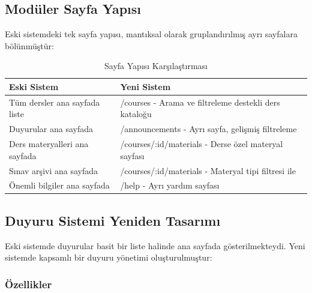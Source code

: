 \documentclass[12pt,a4paper]{article}
\begin{document}
\subsection{Modüler Sayfa Yapısı}

Eski sistemdeki tek sayfa yapısı, mantıksal olarak gruplandırılmış ayrı sayfalara bölünmüştür:

\begin{table}[H]
\centering
\caption{Sayfa Yapısı Karşılaştırması}
\begin{tabular}{@{}p{5cm}p{6cm}@{}}
\toprule
\textbf{Eski Sistem} & \textbf{Yeni Sistem} \\
\midrule
Tüm dersler ana sayfada liste & /courses - Arama ve filtreleme destekli ders kataloğu \\
\addlinespace
Duyurular ana sayfada & /announcements - Ayrı sayfa, gelişmiş filtreleme \\
\addlinespace
Ders materyalleri ana sayfada & /courses/:id/materials - Derse özel materyal sayfası \\
\addlinespace
Sınav arşivi ana sayfada & /courses/:id/materials - Materyal tipi filtresi ile \\
\addlinespace
Önemli bilgiler ana sayfada & /help - Ayrı yardım sayfası \\
\bottomrule
\end{tabular}
\end{table}

\subsection{Duyuru Sistemi Yeniden Tasarımı}

Eski sistemde duyurular basit bir liste halinde ana sayfada gösterilmekteydi. Yeni sistemde kapsamlı bir duyuru yönetimi oluşturulmuştur:

\subsubsection{Özellikler}
\end{document}
